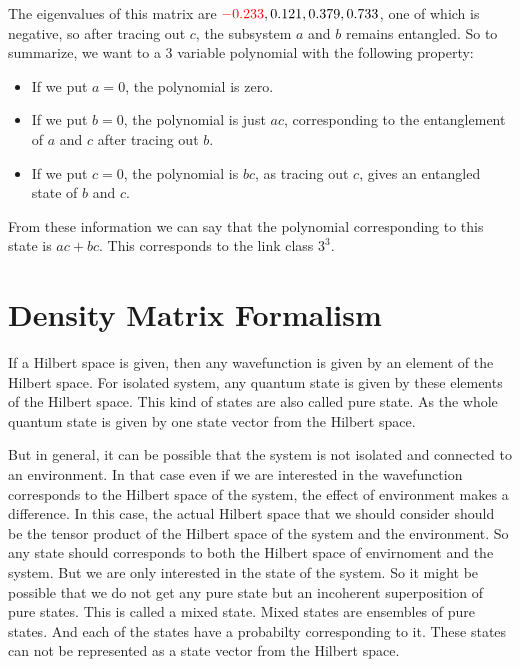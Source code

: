 \documentclass{amsart}
\theoremstyle{plain}
\theoremstyle{definition}
\theoremstyle{plain}
\begin{document}
	The eigenvalues of this matrix are $\textcolor{red}{-0.233}, 0.121, 0.379, 0.733$, one of which is negative, so after tracing out $c$, the subsystem $a$ and $b$ remains entangled.
 So to summarize, we want to a 3 variable polynomial with the following property:
	\begin{itemize}
		\item If we put $a = 0$, the polynomial is zero.
		\item If we put $b = 0$, the polynomial is just $ac$, corresponding to the entanglement of $a$ and $c$ after tracing out $b$.
		\item If we put $c = 0$, the polynomial is $bc$, as tracing out $c$, gives an entangled state of $b$ and $c$.
	\end{itemize}
	From these information we can say that the polynomial corresponding to this state is $ac + bc$. This corresponds to the link class $3^3$.
    
\section{Density Matrix Formalism}
If a Hilbert space is given, then any wavefunction is given by an element of the Hilbert space. For isolated system, any quantum state is given by these elements of the Hilbert space. This kind of states are also called pure state. As the whole quantum state is given by one state vector from the Hilbert space.

But in general, it can be possible that the system is not isolated and connected to an environment. In that case even if we are interested in the wavefunction corresponds to the Hilbert space of the system, the effect of environment makes a difference. In this case, the actual Hilbert space that we should consider should be the tensor product of the Hilbert space of the system and the environment. So any state should corresponds to both the Hilbert space of envirnoment and the system. But we are only interested in the state of the system. So it might be possible that we do not get any pure state but an incoherent superposition of pure states. This is called a mixed state. Mixed states are ensembles of pure states. And each of the states have a probabilty corresponding to it. These states can not be represented as a state vector from the Hilbert space.
\end{document}
